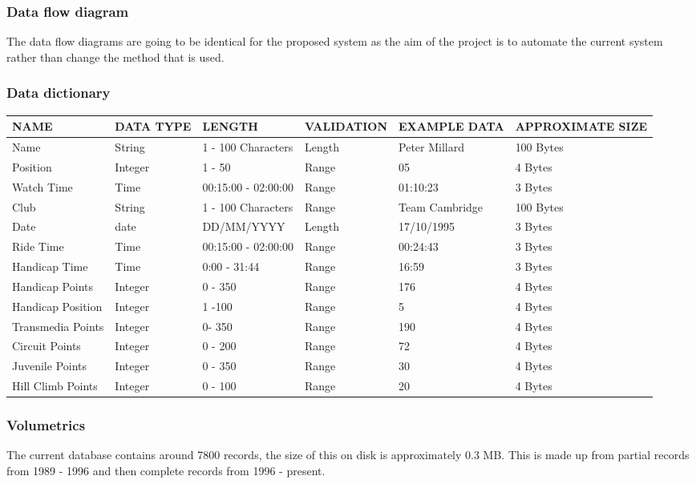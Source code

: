 \subsubsection{Data flow diagram}
The data flow diagrams are going to be identical for the proposed system as the aim of the project is to automate the current system rather than change the method that is used.

\subsubsection{Data dictionary}


\begin{tabular}{|p{1.5cm}|p{1.5cm}|l|l|l|p{2.5cm}|}
	\hline
	NAME & DATA TYPE & LENGTH & VALIDATION & EXAMPLE DATA & APPROXIMATE SIZE \\ \hline
	Name & String & 1 - 100 Characters & Length & Peter Millard & 100 Bytes \\ \hline
	Position & Integer & 1 - 50 & Range & 05 & 4 Bytes \\ \hline
	Watch Time & Time & 00:15:00 - 02:00:00 & Range & 01:10:23 & 3 Bytes \\ \hline
	Club & String & 1 - 100 Characters & Range & Team Cambridge &  100 Bytes\\ \hline
	Date & date & DD/MM/YYYY & Length & 17/10/1995 & 3 Bytes \\ \hline
	Ride Time & Time & 00:15:00 - 02:00:00 & Range & 00:24:43 & 3 Bytes \\ \hline
	Handicap Time & Time & 0:00 - 31:44 & Range & 16:59 & 3 Bytes \\ \hline
	Handicap Points & Integer & 0 - 350 & Range & 176 & 4 Bytes \\ \hline
	Handicap Position & Integer & 1 -100 & Range & 5 & 4 Bytes \\ \hline
	Transmedia Points & Integer & 0- 350 & Range & 190& 4 Bytes \\ \hline
	Circuit Points & Integer & 0 - 200 & Range & 72 & 4 Bytes \\ \hline	
	Juvenile Points & Integer & 0 - 350 & Range & 30 & 4 Bytes \\ \hline
	Hill Climb Points & Integer & 0 - 100 & Range & 20 &  4 Bytes\\ \hline
\end{tabular}

\subsubsection{Volumetrics}
The current database contains around 7800 records, the size of this on disk is approximately 0.3 MB. This is made up from partial records from 1989 - 1996 and then complete records from 1996 - present.


